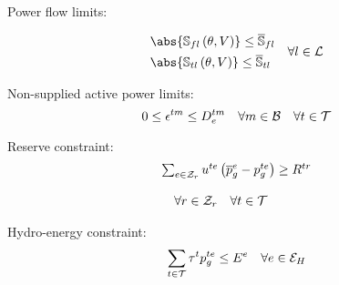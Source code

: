 Power flow limits:

\begin{equation}
\begin{aligned}
&\abs{\mathbb{S}_{fl}\left(\theta,V\right)} \le \overline{\mathbb{S}}_{fl}\\
&\abs{\mathbb{S}_{tl}\left(\theta,V\right)} \le \overline{\mathbb{S}}_{tl}\\
\end{aligned} 
\quad \forall l \in {\cal{L}}
\label{power_lims}
\end{equation}

Non-supplied active power limits:
\begin{equation}
0 \le \epsilon^{tm} \le D^{tm}_{e} \quad \forall m \in {\cal{B}} \quad \forall t  \in {\cal{T}}  
\label{nsd_limits}
\end{equation}

Reserve constraint:
\begin{equation}
\begin{array}{l}
\sum_{e \in {\cal{Z}}_{r}}{u^{te} \left( \overline{p}_{g}^{e} - p_{g}^{te} \right)} \ge R^{tr}\\
{}\\
 \quad \forall r \in {\cal{Z}}_{r} \quad \forall t  \in {\cal{T}}
\end{array}
\label{reserve}
\end{equation}

Hydro-energy constraint:
\begin{equation}
\sum_{t \in {\cal{T}}}{{\tau}^{t} p_{g}^{te}} \le E^{e} \quad \forall e \in {\cal{E}}_{H}
\label{hidro_energy}
\end{equation}









